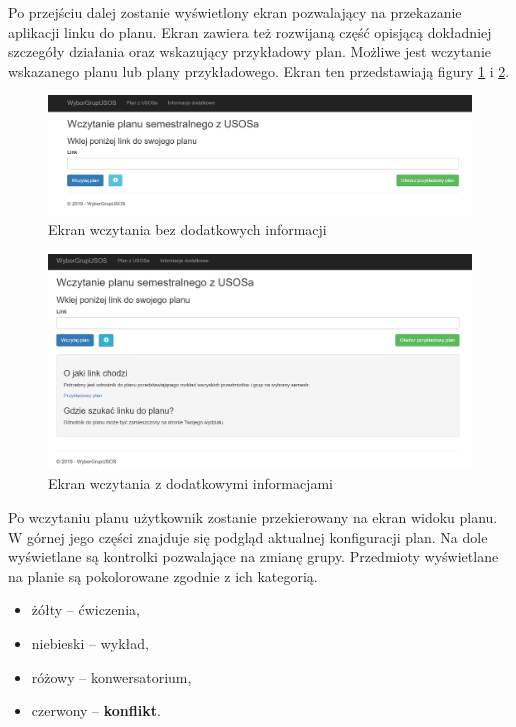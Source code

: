 \documentclass{mwart}
\begin{document}
Po przejściu dalej zostanie wyświetlony ekran pozwalający na przekazanie aplikacji linku do planu. Ekran zawiera też rozwijaną część opisjącą dokładniej szczegóły działania oraz wskazujący przykładowy plan. Możliwe jest wczytanie wskazanego planu lub plany przykładowego. Ekran ten przedstawiają figury \ref{fig:ekranWczytaniaZwiniety} i \ref{fig:ekranWczytaniaRozwiniety}.

\begin{figure}[h]
    \centering
    \includegraphics[width=13cm]{Ekran_wczytania_zwiniety}
    \caption{Ekran wczytania bez dodatkowych informacji}
    \label{fig:ekranWczytaniaZwiniety}
\end{figure}

\begin{figure}[h]
    \centering
    \includegraphics[width=13cm]{Ekran_wczytania_rozwiniety.png}
    \caption{Ekran wczytania z dodatkowymi informacjami}
    \label{fig:ekranWczytaniaRozwiniety}
\end{figure}

Po wczytaniu planu użytkownik zostanie przekierowany na ekran widoku planu. W górnej jego części znajduje się podgląd aktualnej konfiguracji plan. Na dole wyświetlane są kontrolki pozwalające na zmianę grupy. Przedmioty wyświetlane na planie są pokolorowane zgodnie z ich kategorią.

\begin{itemize}
    \item żółty -- ćwiczenia,
    \item niebieski -- wykład,
    \item różowy -- konwersatorium,
    \item czerwony -- \textbf{konflikt}.
\end{itemize}
\end{document}
